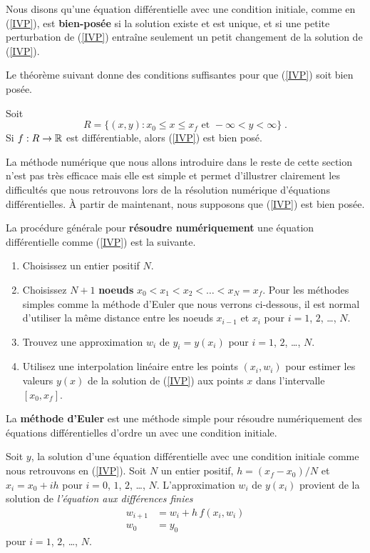 {Nous disons qu'une équation différentielle avec une condition initiale,
comme en (\ref{IVP}), est {\bfseries bien-posée} si la solution existe
et est unique, et si une petite perturbation de (\ref{IVP}) entraîne
seulement un petit changement de la solution de (\ref{IVP}).

Le théorème suivant donne des conditions suffisantes pour que
(\ref{IVP}) soit bien posée.

\begin{theorem}[+\theory]
Soit
\[
R = \{(x,y) : x_0 \leq x \leq x_f \text{ et } -\infty < y < \infty \} \; .
\]
Si $f:R \rightarrow \mathbb{R}$ est différentiable, alors (\ref{IVP}) est
bien posé.
\end{theorem}

La méthode numérique que nous allons introduire dans le reste de cette
section n'est pas très efficace mais elle est simple et permet
d'illustrer clairement les difficultés que nous retrouvons lors de la
résolution numérique d'équations différentielles.  À partir de
maintenant, nous supposons que (\ref{IVP}) est bien posée.

La procédure générale pour {\bfseries résoudre numériquement} une
équation différentielle comme (\ref{IVP}) est la suivante.
\begin{enumerate}
\item Choisissez un entier positif $N$.
\item Choisissez $N+1$ {\bfseries noeuds}
$x_0 < x_1 < x_2 <\ldots< x_N = x_f$.  Pour les méthodes simples comme
la méthode d'Euler que nous verrons ci-dessous, il est normal
d'utiliser la même distance entre les noeuds $x_{i-1}$ et $x_i$ pour
$i=1$, $2$, \ldots, $N$.
\item Trouvez une approximation $w_i$ de $y_i = y(x_i)$ pour
$i=1$, $2$, \ldots, $N$.
\item Utilisez une interpolation linéaire entre les points
$(x_i,w_i)$ pour estimer les valeurs $y(x)$ de la solution de
(\ref{IVP}) aux points $x$ dans l'intervalle $[x_0,x_f]$.
\end{enumerate}

La {\bfseries méthode d'Euler} est une méthode simple pour résoudre
numériquement des équations différentielles d'ordre un avec une
condition initiale.

\begin{meth} 
Soit $y$, la solution d'une équation différentielle avec une condition
initiale comme nous retrouvons en (\ref{IVP}).  Soit $N$ un entier
positif, $h=(x_f-x_0)/N$ et $x_i=x_0+ih$ pour $i=0$, $1$, $2$, \ldots,
$N$.  L'approximation $w_i$ de $y(x_i)$ provient de la solution de
{\em l'équation aux différences finies}
\begin{equation} \label{Euleralgor}
\begin{split}
w_{i+1} & = w_i + h \, f(x_i, w_i) \\
w_0 & = y_0
\end{split}
\end{equation}
pour $i=1$, $2$, \ldots, $N$.
\end{meth}

}
